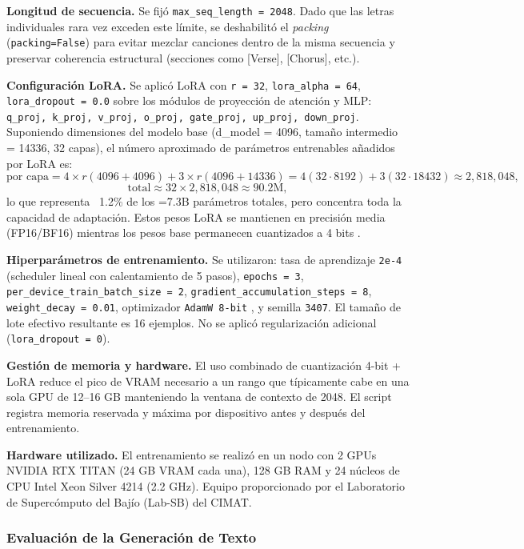 \documentclass[paper=letter, fontsize=11pt, draft=false]{scrartcl}
\numberwithin{equation}{section} %
\numberwithin{figure}{section} %
\numberwithin{table}{section} %
\numberwithin{subsection}{section}
\begin{document}
\textbf{Longitud de secuencia.} Se fijó \texttt{max\_seq\_length = 2048}. Dado que las letras individuales rara vez exceden este límite, se deshabilitó el \emph{packing} (\texttt{packing=False}) para evitar mezclar canciones dentro de la misma secuencia y preservar coherencia estructural (secciones como [Verse], [Chorus], etc.).

\textbf{Configuración LoRA.} Se aplicó LoRA con \texttt{r = 32}, \texttt{lora\_alpha = 64}, \texttt{lora\_dropout = 0.0} sobre los módulos de proyección de atención y MLP: \texttt{q\_proj, k\_proj, v\_proj, o\_proj, gate\_proj, up\_proj, down\_proj}. Suponiendo dimensiones del modelo base (d\_model = 4096, tamaño intermedio = 14336, 32 capas), el número aproximado de parámetros entrenables añadidos por LoRA es:
\[
\text{por capa} = 4 \times r (4096 + 4096) + 3 \times r (4096 + 14336) = 4(32 \cdot 8192) + 3(32 \cdot 18432) \approx 2{,}818{,}048,
\]
\[
\text{total} \approx 32 \times 2{,}818{,}048 \approx 90.2\text{M},
\]
lo que representa ~1.2\% de los =7.3B parámetros totales, pero concentra toda la capacidad de adaptación. Estos pesos LoRA se mantienen en precisión media (FP16/BF16) mientras los pesos base permanecen cuantizados a 4 bits \cite{dettmers2023qloraefficientfinetuningquantized}.

\textbf{Hiperparámetros de entrenamiento.} Se utilizaron: tasa de aprendizaje \texttt{2e-4} (scheduler lineal con calentamiento de 5 pasos), \texttt{epochs = 3}, \texttt{per\_device\_train\_batch\_size = 2}, \texttt{gradient\_accumulation\_steps = 8}, \texttt{weight\_decay = 0.01}, optimizador \texttt{AdamW 8-bit} \cite{dettmers2022optimizers}, y semilla \texttt{3407}. El tamaño de lote efectivo resultante es 16 ejemplos. No se aplicó regularización adicional (\texttt{lora\_dropout = 0}).

\textbf{Gestión de memoria y hardware.} El uso combinado de cuantización 4-bit + LoRA reduce el pico de VRAM necesario a un rango que típicamente cabe en una sola GPU de 12–16 GB manteniendo la ventana de contexto de 2048. El script registra memoria reservada y máxima por dispositivo antes y después del entrenamiento. 

\textbf{Hardware utilizado.} El entrenamiento se realizó en un nodo con 2 GPUs NVIDIA RTX TITAN (24 GB VRAM cada una), 128 GB RAM y 24 núcleos de CPU Intel Xeon Silver 4214 (2.2 GHz). Equipo proporcionado por el Laboratorio de Supercómputo del Bajío (Lab-SB) del CIMAT. 

\subsubsection{Evaluación de la Generación de Texto}
\end{document}
